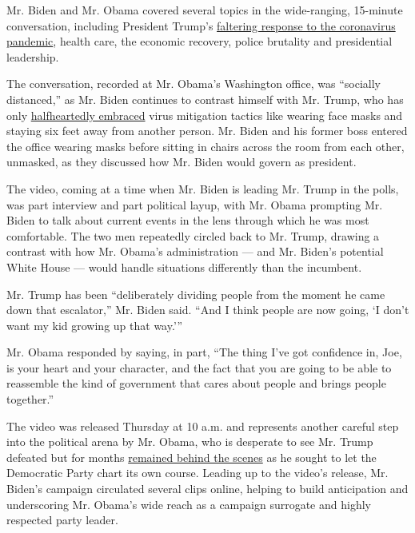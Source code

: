 Mr. Biden and Mr. Obama covered several topics in the wide-ranging,
15-minute conversation, including President Trump's
\href{https://www.nytimes.com/2020/07/18/us/politics/trump-coronavirus-response-failure-leadership.html}{faltering
response to the coronavirus pandemic}, health care, the economic
recovery, police brutality and presidential leadership.

The conversation, recorded at Mr. Obama's Washington office, was
``socially distanced,'' as Mr. Biden continues to contrast himself with
Mr. Trump, who has only
\href{https://www.nytimes.com/2020/07/21/us/politics/trump-coronavirus-masks.html}{halfheartedly
embraced} virus mitigation tactics like wearing face masks and staying
six feet away from another person. Mr. Biden and his former boss entered
the office wearing masks before sitting in chairs across the room from
each other, unmasked, as they discussed how Mr. Biden would govern as
president.

The video, coming at a time when Mr. Biden is leading Mr. Trump in the
polls, was part interview and part political layup, with Mr. Obama
prompting Mr. Biden to talk about current events in the lens through
which he was most comfortable. The two men repeatedly circled back to
Mr. Trump, drawing a contrast with how Mr. Obama's administration ---
and Mr. Biden's potential White House --- would handle situations
differently than the incumbent.

Mr. Trump has been ``deliberately dividing people from the moment he
came down that escalator,'' Mr. Biden said. ``And I think people are now
going, `I don't want my kid growing up that way.'''

Mr. Obama responded by saying, in part, ``The thing I've got confidence
in, Joe, is your heart and your character, and the fact that you are
going to be able to reassemble the kind of government that cares about
people and brings people together.''

The video was released Thursday at 10 a.m. and represents another
careful step into the political arena by Mr. Obama, who is desperate to
see Mr. Trump defeated but for months
\href{https://www.nytimes.com/2019/11/20/us/politics/obama-2020-candidates.html}{remained
behind the scenes} as he sought to let the Democratic Party chart its
own course. Leading up to the video's release, Mr. Biden's campaign
circulated several clips online, helping to build anticipation and
underscoring Mr. Obama's wide reach as a campaign surrogate and highly
respected party leader.

